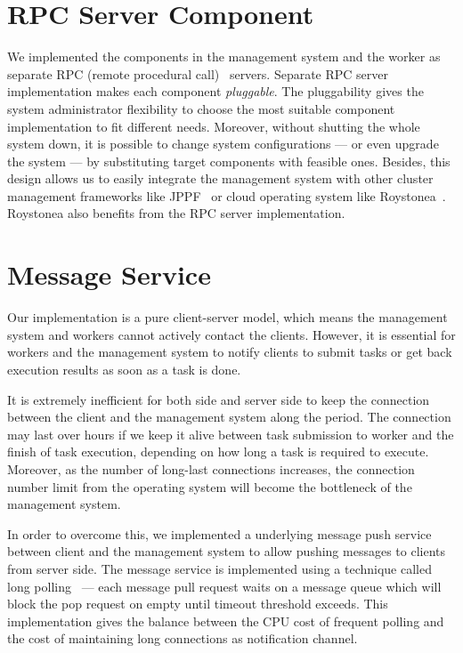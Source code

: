 \section{RPC Server Component}

We implemented the components in the management system and the worker as
separate RPC (remote procedural call)~\cite{cite:RPC} servers.
Separate RPC server implementation makes each component
\emph{pluggable}.
The pluggability gives the system administrator flexibility to choose
the most suitable component implementation to fit different needs.
Moreover, without shutting the whole system down, it is possible to
change system configurations --- or even upgrade the system --- by
substituting target components with feasible ones.
Besides, this design allows us to easily integrate the management system
with other cluster management frameworks like JPPF~\cite{cite:JPPF} or
cloud operating system like Roystonea~\cite{cite:roystonea}.
Roystonea also benefits from the RPC server implementation.

\section{Message Service}

Our implementation is a pure client-server model, which means the
management system and workers cannot actively contact the clients.
However, it is essential for workers and the management system to notify
clients to submit tasks or get back execution results as soon as a task
is done.

It is extremely inefficient for both side and server side to keep the
connection between the client and the management system along the
period.
The connection may last over hours if we keep it alive between task
submission to worker and the finish of task execution, depending on how
long a task is required to execute.
Moreover, as the number of long-last connections increases, the
connection number limit from the operating system will become the
bottleneck of the management system.

In order to overcome this, we implemented a underlying message push
service between client and the management system to allow pushing
messages to clients from server side.
The message service is implemented using a technique called long
polling~\cite{cite:push-pull} --- each message pull request waits on a
message queue which will block the pop request on empty until timeout
threshold exceeds.
This implementation gives the balance between the CPU cost of frequent
polling and the cost of maintaining long connections as notification
channel.

